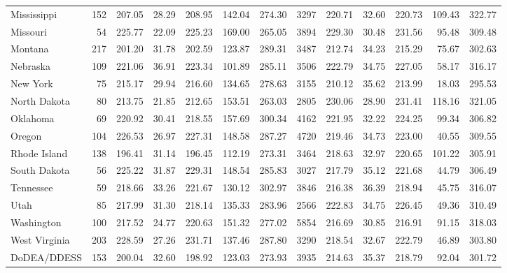 \begin{sidewaystable}[ht]
{\begin{tabular}{lrrrrrr@{\extracolsep{10pt}}rrrrrr}
  Mississippi & 152 & 207.05 & 28.29 & 208.95 & 142.04 & 274.30 & 3297 & 220.71 & 32.60 & 220.73 & 109.43 & 322.77 \\ 
  Missouri &  54 & 225.77 & 22.09 & 225.23 & 169.00 & 265.05 & 3894 & 229.30 & 30.48 & 231.56 & 95.48 & 309.48 \\ 
  Montana & 217 & 201.20 & 31.78 & 202.59 & 123.87 & 289.31 & 3487 & 212.74 & 34.23 & 215.29 & 75.67 & 302.63 \\ 
  Nebraska & 109 & 221.06 & 36.91 & 223.34 & 101.89 & 285.11 & 3506 & 222.79 & 34.75 & 227.05 & 58.17 & 316.17 \\ 
  New York &  75 & 215.17 & 29.94 & 216.60 & 134.65 & 278.63 & 3155 & 210.12 & 35.62 & 213.99 & 18.03 & 295.53 \\ 
  North Dakota &  80 & 213.75 & 21.85 & 212.65 & 153.51 & 263.03 & 2805 & 230.06 & 28.90 & 231.41 & 118.16 & 321.05 \\ 
  Oklahoma &  69 & 220.92 & 30.41 & 218.55 & 157.69 & 300.34 & 4162 & 221.95 & 32.22 & 224.25 & 99.34 & 306.82 \\ 
  Oregon & 104 & 226.53 & 26.97 & 227.31 & 148.58 & 287.27 & 4720 & 219.46 & 34.73 & 223.00 & 40.55 & 309.55 \\ 
  Rhode Island & 138 & 196.41 & 31.14 & 196.45 & 112.19 & 273.31 & 3464 & 218.63 & 32.97 & 220.65 & 101.22 & 305.91 \\ 
  South Dakota &  56 & 225.22 & 31.87 & 229.31 & 148.54 & 285.83 & 3027 & 217.79 & 35.12 & 221.68 & 44.79 & 306.49 \\ 
  Tennessee &  59 & 218.66 & 33.26 & 221.67 & 130.12 & 302.97 & 3846 & 216.38 & 36.39 & 218.94 & 45.75 & 316.07 \\ 
  Utah &  85 & 217.99 & 31.30 & 218.14 & 135.33 & 283.96 & 2566 & 222.83 & 34.75 & 226.45 & 49.36 & 310.49 \\ 
  Washington & 100 & 217.52 & 24.77 & 220.63 & 151.32 & 277.02 & 5854 & 216.69 & 30.85 & 216.91 & 91.15 & 318.03 \\ 
  West Virginia & 203 & 228.59 & 27.26 & 231.71 & 137.46 & 287.80 & 3290 & 218.54 & 32.67 & 222.79 & 46.89 & 303.80 \\ 
  DoDEA/DDESS & 153 & 200.04 & 32.60 & 198.92 & 123.03 & 273.93 & 3935 & 214.63 & 35.37 & 218.79 & 92.04 & 301.72 \\ 
   \hline
\end{tabular}}
\end{sidewaystable}
